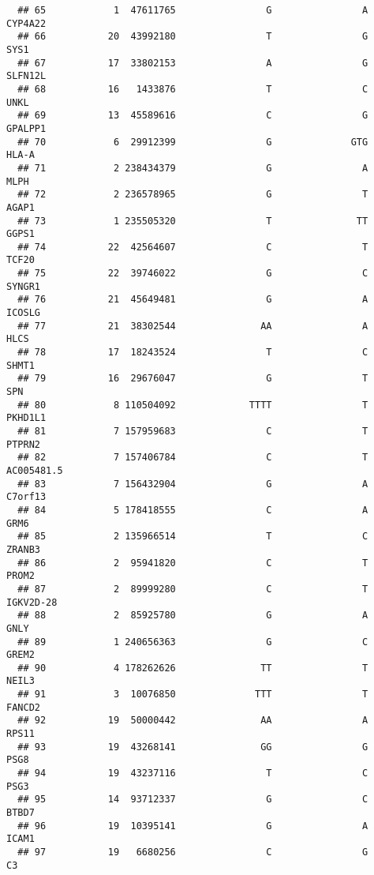 \documentclass[12pt,twoside]{reedthesis}
\theoremstyle{definition}
\theoremstyle{definition}
\theoremstyle{remark}
\begin{document}
\begin{verbatim}
  ## 65            1  47611765                G                A        CYP4A22
  ## 66           20  43992180                T                G           SYS1
  ## 67           17  33802153                A                G        SLFN12L
  ## 68           16   1433876                T                C           UNKL
  ## 69           13  45589616                C                G        GPALPP1
  ## 70            6  29912399                G              GTG          HLA-A
  ## 71            2 238434379                G                A           MLPH
  ## 72            2 236578965                G                T          AGAP1
  ## 73            1 235505320                T               TT          GGPS1
  ## 74           22  42564607                C                T          TCF20
  ## 75           22  39746022                G                C         SYNGR1
  ## 76           21  45649481                G                A         ICOSLG
  ## 77           21  38302544               AA                A           HLCS
  ## 78           17  18243524                T                C          SHMT1
  ## 79           16  29676047                G                T            SPN
  ## 80            8 110504092             TTTT                T        PKHD1L1
  ## 81            7 157959683                C                T         PTPRN2
  ## 82            7 157406784                C                T     AC005481.5
  ## 83            7 156432904                G                A        C7orf13
  ## 84            5 178418555                C                A           GRM6
  ## 85            2 135966514                T                C         ZRANB3
  ## 86            2  95941820                C                T          PROM2
  ## 87            2  89999280                C                T      IGKV2D-28
  ## 88            2  85925780                G                A           GNLY
  ## 89            1 240656363                G                C          GREM2
  ## 90            4 178262626               TT                T          NEIL3
  ## 91            3  10076850              TTT                T         FANCD2
  ## 92           19  50000442               AA                A          RPS11
  ## 93           19  43268141               GG                G           PSG8
  ## 94           19  43237116                T                C           PSG3
  ## 95           14  93712337                G                C          BTBD7
  ## 96           19  10395141                G                A          ICAM1
  ## 97           19   6680256                C                G             C3

\end{verbatim}
\end{document}
